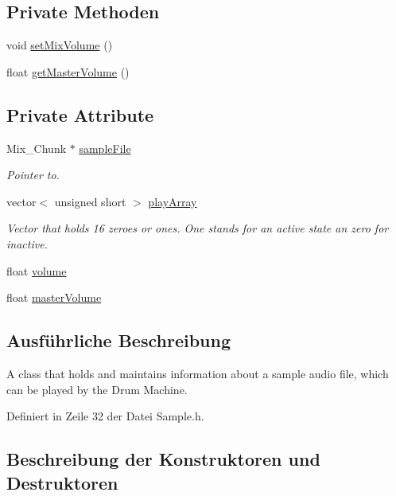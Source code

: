 \subsection*{Private Methoden}
\begin{DoxyCompactItemize}
\item 
void \hyperlink{class_sample_a6d13988721d2190947f65969d4737a48}{set\+Mix\+Volume} ()
\item 
float \hyperlink{class_sample_afceddb412ab50a67cb98ca6b72456f24}{get\+Master\+Volume} ()
\end{DoxyCompactItemize}
\subsection*{Private Attribute}
\begin{DoxyCompactItemize}
\item 
Mix\+\_\+\+Chunk $\ast$ \hyperlink{class_sample_ae158342c8d18a05de1c85802f7cfbd2a}{sample\+File}
\begin{DoxyCompactList}\small\item\em Pointer to. \end{DoxyCompactList}\item 
vector$<$ unsigned short $>$ \hyperlink{class_sample_a824014df7294cb94445e7ee89cc15987}{play\+Array}
\begin{DoxyCompactList}\small\item\em Vector that holds 16 zeroes or ones. One stands for an active state an zero for inactive. \end{DoxyCompactList}\item 
float \hyperlink{class_sample_a74a4b4799b2bdec9fdde363992b9cec8}{volume}
\item 
float \hyperlink{class_sample_a2d48ff8caf8425c37cf74130afb0c87a}{master\+Volume}
\end{DoxyCompactItemize}


\subsection{Ausführliche Beschreibung}
A class that holds and maintains information about a sample audio file, which can be played by the Drum Machine. 

Definiert in Zeile 32 der Datei Sample.\+h.



\subsection{Beschreibung der Konstruktoren und Destruktoren}
\mbox{\label{class_sample_a7aea6b090998a430341aa6d1d6222c63}} 
